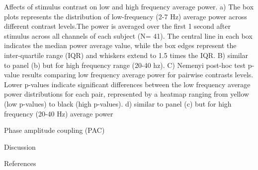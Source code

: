 \documentclass[
  letterpaper,
  DIV=11,
  numbers=noendperiod]{scrartcl}
\begin{document}
Affects of stimulus contrast on low and high frequency average power. a)
The box plots represents the distribution of low-frequency (2-7 Hz)
average power across different contrast levels.The power is averaged
over the first 1 second after stimulus across all channels of each
subject (N= 41). The central line in each box indicates the median power
average value, while the box edges represent the inter-quartile range
(IQR) and whiskers extend to 1.5 times the IQR. B) similar to panel (b)
but for high frequency range (20-40 hz). C) Nemenyi post-hoc test
p-value results comparing low frequency average power for pairwise
contrasts levels. Lower p-values indicate significant differences
between the low frequency average power distributions for each pair,
represented by a heatmap ranging from yellow (low p-values) to black
(high p-values). d) similar to panel (c) but for high frequency (20-40
Hz) average power

Phase amplitude coupling (PAC)

Discussion

References
\end{document}
